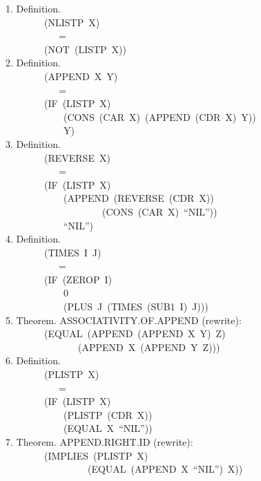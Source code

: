 \documentclass[10pt]{book}
\newenvironment{pubasis}{\begin{flushleft}}{\end{flushleft}}
\begin{document}
\begin{pubasis}
1.      Definition.\\
~~~~~~~~(NLISTP~X)\\
~~~~~~~~~~~=\\
~~~~~~~~(NOT~(LISTP~X))\\

2.      Definition.\\
~~~~~~~~(APPEND~X~Y)\\
~~~~~~~~~~~=\\
~~~~~~~~(IF~(LISTP~X)\\
~~~~~~~~~~~~(CONS~(CAR~X)~(APPEND~(CDR~X)~Y))\\
~~~~~~~~~~~~Y)\\

3.      Definition.\\
~~~~~~~~(REVERSE~X)\\
~~~~~~~~~~~=\\
~~~~~~~~(IF~(LISTP~X)\\
~~~~~~~~~~~~(APPEND~(REVERSE~(CDR~X))\\
~~~~~~~~~~~~~~~~~~~~(CONS~(CAR~X)~``NIL''))\\
~~~~~~~~~~~~``NIL'')\\

4.      Definition.\\
~~~~~~~~(TIMES~I~J)\\
~~~~~~~~~~~=\\
~~~~~~~~(IF~(ZEROP~I)\\
~~~~~~~~~~~~0\\
~~~~~~~~~~~~(PLUS~J~(TIMES~(SUB1~I)~J)))\\

5.      Theorem.  ASSOCIATIVITY.OF.APPEND (rewrite):\\
~~~~~~~~(EQUAL~(APPEND~(APPEND~X~Y)~Z)\\
~~~~~~~~~~~~~~~(APPEND~X~(APPEND~Y~Z)))\\

6.      Definition.\\
~~~~~~~~(PLISTP~X)\\
~~~~~~~~~~~=\\
~~~~~~~~(IF~(LISTP~X)\\
~~~~~~~~~~~~(PLISTP~(CDR~X))\\
~~~~~~~~~~~~(EQUAL~X~``NIL''))\\

7.      Theorem.  APPEND.RIGHT.ID (rewrite):\\
~~~~~~~~(IMPLIES~(PLISTP~X)\\
~~~~~~~~~~~~~~~~~(EQUAL~(APPEND~X~``NIL'')~X))\\


\end{pubasis}
\end{document}
